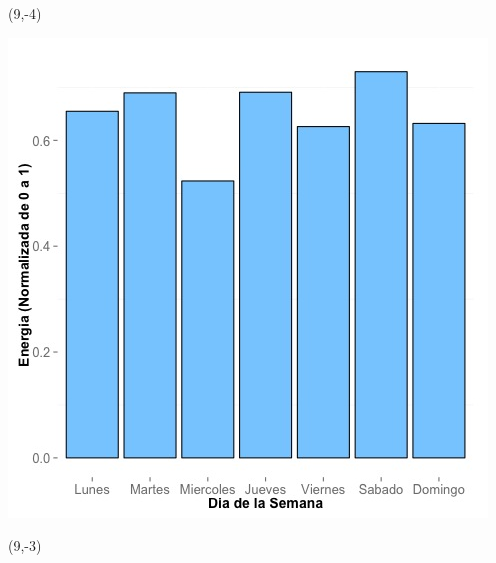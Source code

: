 \documentclass{article}\usepackage[]{graphicx}\usepackage[]{color}
\newenvironment{knitrout}{}{} %
\begin{document}
 \begin{textblock}{1}(9,-4)
\begin{minipage}{20em}
\begingroup

\endgroup
\end{minipage}
\end{textblock}


\begin{knitrout}
\color{fgcolor}
\includegraphics[scale=0.65]{figure/A8_day_of_week_plot} 
\end{knitrout}


 \begin{textblock}{1}(9,-3)
\begin{minipage}{20em}
\begingroup

\endgroup
\end{minipage}
\end{textblock}
\end{document}
